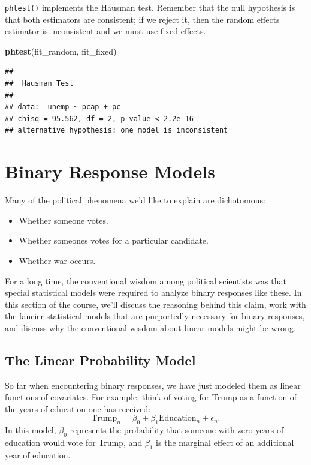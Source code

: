 \documentclass[
  12pt,
  oneside,openany]{book}
\newenvironment{Shaded}{\begin{snugshade}}{\end{snugshade}}
\newcommand{\KeywordTok}[1]{\textcolor[rgb]{0.13,0.29,0.53}{\textbf{#1}}}
\newcommand{\NormalTok}[1]{#1}
\begin{document}
\texttt{phtest()} implements the Hausman test. Remember that the null hypothesis is that both estimators are consistent; if we reject it, then the random effects estimator is inconsistent and we must use fixed effects.

\begin{Shaded}
\begin{Highlighting}[]
\KeywordTok{phtest}\NormalTok{(fit\_random, fit\_fixed)}
\end{Highlighting}
\end{Shaded}

\begin{verbatim}
## 
##  Hausman Test
## 
## data:  unemp ~ pcap + pc
## chisq = 95.562, df = 2, p-value < 2.2e-16
## alternative hypothesis: one model is inconsistent
\end{verbatim}

\hypertarget{logit}{%
\chapter{Binary Response Models}\label{logit}}

Many of the political phenomena we'd like to explain are dichotomous:

\begin{itemize}
\item
  Whether someone votes.
\item
  Whether someones votes for a particular candidate.
\item
  Whether war occurs.
\end{itemize}

For a long time, the conventional wisdom among political scientists was that special statistical models were required to analyze binary responses like these.
In this section of the course, we'll discuss the reasoning behind this claim, work with the fancier statistical models that are purportedly necessary for binary responses, and discuss why the conventional wisdom about linear models might be wrong.

\hypertarget{the-linear-probability-model}{%
\section{The Linear Probability Model}\label{the-linear-probability-model}}

So far when encountering binary responses, we have just modeled them as linear functions of covariates.
For example, think of voting for Trump as a function of the years of education one has received:
\[
\text{Trump}_n = \beta_0 + \beta_1 \text{Education}_n + \epsilon_n.
\]
In this model, \(\beta_0\) represents the probability that someone with zero years of education would vote for Trump, and \(\beta_1\) is the marginal effect of an additional year of education.
\end{document}
